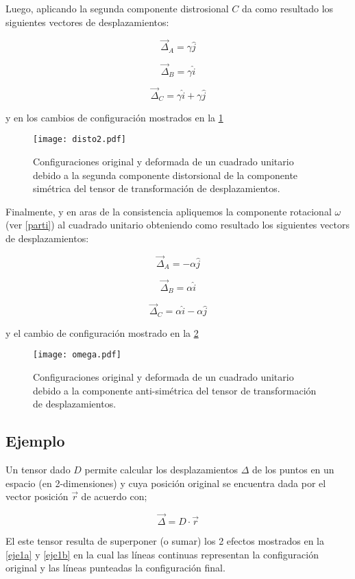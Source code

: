 \documentclass[../notas medios.tex]{subfiles}
\begin{document}
Luego, aplicando la segunda componente distrosional $C$ da como resultado los siguientes vectores de desplazamientos:

\[{{\vec \Delta }_A} = \gamma \hat j\]

\[{{\vec \Delta }_B} = \gamma \hat i\]

\[{{\vec \Delta }_C} = \gamma \hat i + \gamma \hat j\]

y en los cambios de configuración mostrados en la \cref{disto2}

\begin{figure}[H]
\centering
	\texttt{[image: disto2.pdf]}
	\caption{Configuraciones original y deformada de un cuadrado unitario debido a la segunda componente distorsional de la componente simétrica del tensor de transformación de desplazamientos.}
	\label{disto2}
\end{figure}

Finalmente, y en aras de la consistencia apliquemos la componente rotacional $\omega$ (ver \cref{parti}) al cuadrado unitario obteniendo como resultado los siguientes vectors de desplazamientos:

\[{{\vec \Delta }_A} =  - \alpha \hat j\]

\[{{\vec \Delta }_B} = \alpha \hat i\]

\[{{\vec \Delta }_C} = \alpha \hat i - \alpha \hat j\]

y el cambio de configuración mostrado en la \cref{rotarota}

\begin{figure}[H]
\centering
	\texttt{[image: omega.pdf]}
	\caption{Configuraciones original y deformada de un cuadrado unitario debido a la componente anti-simétrica del tensor de transformación de desplazamientos.}
	\label{rotarota}
\end{figure}


\subsection*{Ejemplo}
Un tensor dado $D$ permite calcular los desplazamientos $\Delta$   de los puntos en un espacio (en 2-dimensiones) y cuya posición original se encuentra dada por el vector posición ${\vec r}$   de acuerdo con;

\[\vec \Delta  = D \cdot \vec r\]

El este tensor resulta de superponer (o sumar) los 2 efectos mostrados en la \cref{eje1a} y \cref{eje1b} en la cual las líneas continuas representan la configuración original y las líneas punteadas la configuración final.
\end{document}
